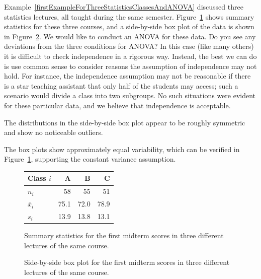 \begin{examplewrap}
\begin{nexample}{Example~\vref{firstExampleForThreeStatisticsClassesAndANOVA} discussed three statistics lectures, all taught during the same semester. Figure~\ref{summaryStatisticsForClassTestData} shows summary statistics for these three courses, and a side-by-side box plot of the data is shown in Figure~\ref{classDataSBSBoxPlot}. We would like to conduct an ANOVA for these data. Do you see any deviations from the three conditions for ANOVA?}
In this case (like many others) it is difficult to check independence in a rigorous way. Instead, the best we can do is use common sense to consider reasons the assumption of independence may not hold. For instance, the independence assumption may not be reasonable if there is a star teaching assistant that only half of the students may access; such a scenario would divide a class into two subgroups. No such situations were evident for these particular data, and we believe that independence is acceptable.

The distributions in the side-by-side box plot appear to be roughly symmetric and show no noticeable outliers.

The box plots show approximately equal variability, which can be verified in Figure~\ref{summaryStatisticsForClassTestData}, supporting the constant variance assumption.
\end{nexample}
\end{examplewrap}

\begin{figure}
\centering
\begin{tabular}{lrrr}
  \hline
Class $i$	& A	& B	& C \\ 
  \hline
$n_i$		& 58	& 55	& 51 \\ 
$\bar{x}_i$	& 75.1	& 72.0	& 78.9 \\ 
$s_i$		& 13.9	& 13.8	& 13.1 \\ 
\hline
\end{tabular}
\caption{Summary statistics for the first midterm scores in three different lectures of the same course.}
\label{summaryStatisticsForClassTestData}
\end{figure}

\begin{figure}
  \centering
  \caption{Side-by-side box plot for the first midterm
      scores in three different  lectures of the same course.}
  \label{classDataSBSBoxPlot}
\end{figure}

